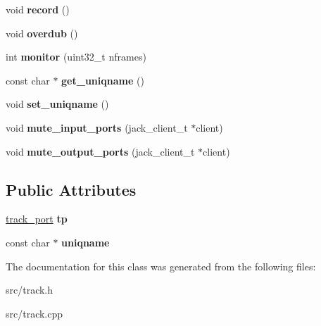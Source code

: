 \begin{DoxyCompactItemize}
void {\bfseries record} ()
\item 
\mbox{\label{classtrack_af118a033f9bfb048c5da9486bd85a643}} 
void {\bfseries overdub} ()
\item 
\mbox{\label{classtrack_a6b2cea1fdb0f55b67bf0e2e0777bcb9f}} 
int {\bfseries monitor} (uint32\+\_\+t nframes)
\item 
\mbox{\label{classtrack_a645137cd6b283eb3f2f5a72c1eea8c74}} 
const char $\ast$ {\bfseries get\+\_\+uniqname} ()
\item 
\mbox{\label{classtrack_a570b552f2a08daaff3fe0ba993f88ab2}} 
void {\bfseries set\+\_\+uniqname} ()
\item 
\mbox{\label{classtrack_aeb12911b71eb76a226cf4d3750fa70d1}} 
void {\bfseries mute\+\_\+input\+\_\+ports} (jack\+\_\+client\+\_\+t $\ast$client)
\item 
\mbox{\label{classtrack_af6a0dfeed9dd6551d228631a9acac33c}} 
void {\bfseries mute\+\_\+output\+\_\+ports} (jack\+\_\+client\+\_\+t $\ast$client)
\end{DoxyCompactItemize}
\subsection*{Public Attributes}
\begin{DoxyCompactItemize}
\item 
\mbox{\label{classtrack_adceeb14b636b259fc4c06f5d67ffaf81}} 
\mbox{\hyperlink{structtrack__port}{track\+\_\+port}} {\bfseries tp}
\item 
\mbox{\label{classtrack_a239c9e283c7ecae2bbe5bbc16a89eec7}} 
const char $\ast$ {\bfseries uniqname}
\end{DoxyCompactItemize}


The documentation for this class was generated from the following files\+:\begin{DoxyCompactItemize}
\item 
src/track.\+h\item 
src/track.\+cpp\end{DoxyCompactItemize}
